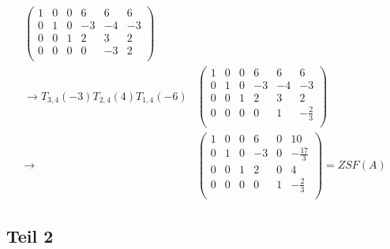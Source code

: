 \documentclass[a4paper,10pt]{article}
\begin{document}
\begin{align*}
\begin{pmatrix}
  1 & 0 & 0 & 6 & 6 & 6\\
  0 & 1 & 0 & -3 & -4 & -3\\
  0 & 0 & 1 & 2 & 3 & 2\\
  0 & 0 & 0 & 0 & -3 & 2\\
 \end{pmatrix}\\
 \longrightarrow T_{3,4}(-3)T_{2,4}(4)T_{1,4}(-6)
 & \begin{pmatrix}
  1 & 0 & 0 & 6 & 6 & 6\\
  0 & 1 & 0 & -3 & -4 & -3\\
  0 & 0 & 1 & 2 & 3 & 2\\
  0 & 0 & 0 & 0 & 1 & -\frac{2}{3}\\
 \end{pmatrix}\\
 \longrightarrow
 & \begin{pmatrix}
  1 & 0 & 0 & 6 & 0 & 10\\
  0 & 1 & 0 & -3 & 0 & -\frac{17}{3}\\
  0 & 0 & 1 & 2 & 0 & 4\\
  0 & 0 & 0 & 0 & 1 & -\frac{2}{3}\\
 \end{pmatrix} = ZSF(A)
\end{align*}

\subsection*{Teil 2}
\end{document}
